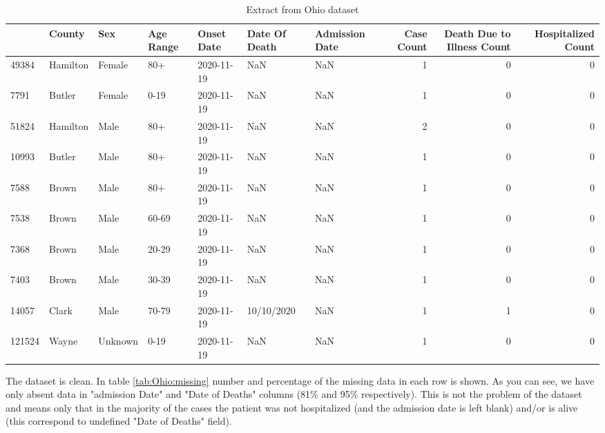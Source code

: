 \documentclass[conference]{IEEEtran}
\begin{document}
\begin{table}
  \tiny
  \centering
  \begin{tabular}{lllllllrrr}
\toprule
{} &    County &      Sex & Age Range & Onset Date & Date Of Death & Admission Date &  Case Count &  Death Due to Illness Count &  Hospitalized Count \\
\midrule
49384  &  Hamilton &   Female &       80+ & 2020-11-19 &           NaN &            NaN &           1 &                           0 &                   0 \\
7791   &    Butler &   Female &      0-19 & 2020-11-19 &           NaN &            NaN &           1 &                           0 &                   0 \\
51824  &  Hamilton &     Male &       80+ & 2020-11-19 &           NaN &            NaN &           2 &                           0 &                   0 \\
10993  &    Butler &     Male &       80+ & 2020-11-19 &           NaN &            NaN &           1 &                           0 &                   0 \\
7588   &     Brown &     Male &       80+ & 2020-11-19 &           NaN &            NaN &           1 &                           0 &                   0 \\
7538   &     Brown &     Male &     60-69 & 2020-11-19 &           NaN &            NaN &           1 &                           0 &                   0 \\
7368   &     Brown &     Male &     20-29 & 2020-11-19 &           NaN &            NaN &           1 &                           0 &                   0 \\
7403   &     Brown &     Male &     30-39 & 2020-11-19 &           NaN &            NaN &           1 &                           0 &                   0 \\
14057  &     Clark &     Male &     70-79 & 2020-11-19 &    10/10/2020 &            NaN &           1 &                           1 &                   0 \\
121524 &     Wayne &  Unknown &      0-19 & 2020-11-19 &           NaN &            NaN &           1 &                           0 &                   0 \\
\bottomrule
\end{tabular}
\caption{Extract from Ohio dataset}
\label{tab:OhioDS}
\end{table}

The dataset is clean. In table \ref{tab:Ohio:missing} number and percentage of the missing data in each row is shown. As you can see, we have only absent data in "admission Date" and "Date of Deaths" columns (81\% and 95\% respectively). This is not the problem of the dataset and means only that in the majority of the cases the patient was not hospitalized (and the admission date is left blank) and/or is alive (this correspond to undefined "Date of Deaths" field).
\end{document}
